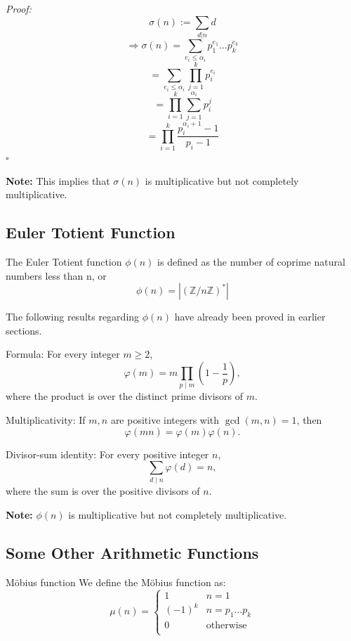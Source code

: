 \documentclass[a4paper,11pt,abstracton]{scrartcl}
\theoremstyle{dotlessP}
\theoremstyle{dotlessS}
\theoremstyle{remark}
\theoremstyle{definition}
\begin{document}
\begin{claim_box}
\textit{Proof:}
$$\sigma (n) := \sum_{d|n} d$$
$$\Rightarrow \sigma(n)= \sum_{e_i \le \alpha_i}p_1^{e_1} \dots p_k^{e_k}$$
$$=\sum_{e_i \le \alpha_i} \prod_{j=1}^{k} p_i^{e_i}$$
$$= \prod_{i=1}^{k}\sum_{j=1}^{\alpha_i}p_i^{j}$$
$$= \prod_{i=1}^{k}\frac{p_i^{\alpha_i+1}-1}{p_i-1}$$
\hfill$\square$
\end{claim_box}

\textbf{Note:} This implies that $\sigma(n)$ is multiplicative but not completely multiplicative.

\subsection{Euler Totient Function}
\begin{definition_box}
The Euler Totient function $\phi (n)$ is defined as the number of coprime natural numbers less than n, or
$$\phi (n) = |(\mathbb{Z}/n\mathbb{Z})^*|$$
\end{definition_box}

The following results regarding $\phi (n)$ have already been proved in earlier sections.

\begin{mainbox}{Formula:}
For every integer $m\geq2$,
\[
    \varphi(m)=m\prod_{p\mid m}\left(1-\frac1p\right),
\]
where the product is over the distinct prime divisors of $m$.
\end{mainbox}

\begin{mainbox}{Multiplicativity:}
If $m,n$ are positive integers with $\gcd(m,n)=1$, then
\[
    \boxed{\varphi(mn)=\varphi(m)\varphi(n).}
\]
\end{mainbox}

\begin{mainbox}{Divisor-sum identity:}
For every positive integer $n$,
\[
    \boxed{\sum_{d\mid n}\varphi(d)=n,}
\]
where the sum is over the positive divisors of $n$.
\end{mainbox}

\textbf{Note:} $\phi(n)$ is multiplicative but not completely multiplicative.

\subsection{Some Other Arithmetic Functions}
\begin{mainbox}{Möbius function}
We define the Möbius function as:
\begin{equation}
\mu(n)=
    \begin{cases}
        1 &  n=1\\
        (-1)^k & n= p_1 \dots p_k\\
        0 & \text{otherwise}\\
    \end{cases}
\end{equation}
\end{mainbox}
\end{document}
